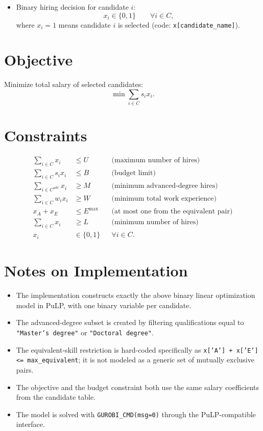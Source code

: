 \begin{itemize}
    \item Binary hiring decision for candidate $i$:
    \[
    x_i \in \{0,1\}\qquad \forall i\in C,
    \]
    where $x_i=1$ means candidate $i$ is selected (code: \texttt{x[candidate\_name]}).
\end{itemize}

\section*{Objective}

Minimize total salary of selected candidates:
\[
\min \sum_{i\in C} s_i x_i.
\]

\section*{Constraints}

\begin{align}
\sum_{i\in C} x_i &\le U
&& \text{(maximum number of hires)}\\
\sum_{i\in C} s_i x_i &\le B
&& \text{(budget limit)}\\
\sum_{i\in C^{\mathrm{adv}}} x_i &\ge M
&& \text{(minimum advanced-degree hires)}\\
\sum_{i\in C} w_i x_i &\ge W
&& \text{(minimum total work experience)}\\
x_A + x_E &\le E^{\max}
&& \text{(at most one from the equivalent pair)}\\
\sum_{i\in C} x_i &\ge L
&& \text{(minimum number of hires)}\\
x_i &\in \{0,1\}
&& \forall i\in C.
\end{align}

\section*{Notes on Implementation}

\begin{itemize}
    \item The implementation constructs exactly the above binary linear optimization model in PuLP, with one binary variable per candidate.
    \item The advanced-degree subset is created by filtering qualifications equal to \texttt{"Master's degree"} or \texttt{"Doctoral degree"}.
    \item The equivalent-skill restriction is hard-coded specifically as \texttt{x['A'] + x['E'] <= max\_equivalent}; it is not modeled as a generic set of mutually exclusive pairs.
    \item The objective and the budget constraint both use the same salary coefficients from the candidate table.
    \item The model is solved with \texttt{GUROBI\_CMD(msg=0)} through the PuLP-compatible interface.
\end{itemize}
